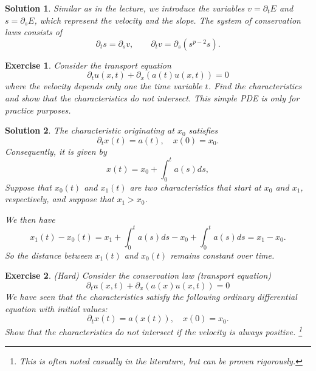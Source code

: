 \documentclass[10pt,letterpaper]{article}
\theoremstyle{break}
\newtheorem{exercise}{Exercise}
\newtheorem{solution}{Solution}
\begin{document}
\begin{solution}
    Similar as in the lecture, we introduce the variables $v = \partial_t E$ and $s = \partial_s E$, which represent the velocity and the slope.
    The system of conservation laws consists of 
    $$
        \partial_t s = \partial_s v,
        \qquad
        \partial_t v = \partial_s \left( s^{p-2} s \right).
    $$
\end{solution}




\begin{exercise}
    Consider the transport equation 
    $$
        \partial_t u(x,t) + \partial_x\left( a(t) u(x,t) \right) = 0
    $$
    where the velocity depends only one the time variable $t$.
    Find the characteristics and show that the characteristics do not intersect.
    \textit{This simple PDE is only for practice purposes.}
\end{exercise}

\begin{solution}
    The characteristic originating at $x_0$ satisfies 
    $$
        \partial_t x(t) = a(t), \quad x(0) = x_0.
    $$
    Consequently, it is given by 
    $$
        x(t) = x_0 + \int_0^t a(s) ds,
    $$
    Suppose that $x_0(t)$ and $x_1(t)$ are two characteristics that start at $x_0$ and $x_1$, respectively, and suppose that $x_1 > x_0$.

    We then have 
    $$
        x_1(t) - x_0(t)
        =
        x_1 + \int_0^t a(s) ds - x_0 + \int_0^t a(s) ds
        =
        x_1 - x_0
        .
    $$
    So the distance between $x_1(t)$ and $x_0(t)$ remains constant over time.
\end{solution}







\begin{exercise}
    (Hard) Consider the conservation law (transport equation)
    $$
        \partial_t u(x,t) + \partial_x\left( a(x) u(x,t) \right) = 0
    $$
    We have seen that the characteristics satisfy the following ordinary differential equation with initial values:
    $$
        \partial_t x(t) = a(x(t)), \quad x(0) = x_0.
    $$
    Show that the characteristics do not intersect if the velocity is always positive. \footnote{This is often noted casually in the literature, but can be proven rigorously.}
\end{exercise}
\end{document}
